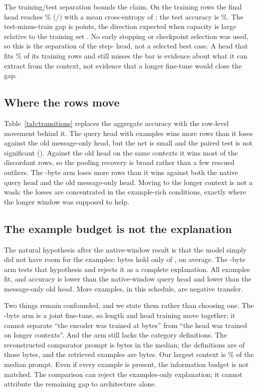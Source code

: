 \documentclass[11pt]{article}
\begin{document}
The training/test separation bounds the claim. On the \PTrainN{} training rows
the final head reaches \PTrainAcc\% (\PTrainCorrect/\PTrainN) with a mean
cross-entropy of \PTrainLoss; the test accuracy is \PTestAcc\%. The
test-minus-train gap is \PTrainGap{} points, the direction expected when
capacity is large relative to the training set \citep{zhang2017rethinking}. No
early stopping or checkpoint selection was used, so this is the separation of
the step-\PSteps{} head, not a selected best case. A head that fits
\PTrainAcc\% of its training rows and still misses the bar is evidence about
what it can extract from the context, not evidence that a longer fine-tune
would close the gap.

\subsection{Where the rows move}

Table~\ref{tab:transitions} replaces the aggregate accuracy with the row-level
movement behind it. The query head with examples wins more rows than it loses
against the old message-only head, but the net is small and the paired test is
not significant (\PQueryVsOldZeroPText). Against the old head on the same
contexts it wins most of the discordant rows, so the pooling recovery is broad
rather than a few rescued outliers. The \PSeq-byte arm loses more rows than it
wins against both the native query head and the old message-only head. Moving
to the longer context is not a wash: the losses are concentrated in the
example-rich conditions, exactly where the longer window was supposed to help.



\subsection{The example budget is not the explanation}

The natural hypothesis after the native-window result is that the model simply
did not have room for the examples: \PNativeBudget{} bytes hold only
\PQueryEff{} of \PExamples{}, on average. The \PSeq-byte arm tests that
hypothesis and rejects it as a complete explanation. All \PExamples{} examples
fit, and accuracy is lower than the native-window query head and lower than the
message-only old head. More examples, in this schedule, are negative transfer.

Two things remain confounded, and we state them rather than choosing one. The
\PSeq-byte arm is a joint fine-tune, so length and head training move together;
it cannot separate ``the encoder was trained at \PSeq{} bytes'' from ``the head
was trained on longer contexts''. And the arm still lacks the \PLabels{}
category definitions. The reconstructed comparator prompt is
\PJevPromptMedian{} bytes in the median; the definitions are \PJevDefsBytes{} of
those bytes, and the retrieved examples are \PJevExamplesMedian{} bytes. Our
largest context is \PAzuriteShare\% of the median prompt. Even if every example
is present, the information budget is not matched. The comparison can reject
the examples-only explanation; it cannot attribute the remaining gap to
architecture alone.
\end{document}
